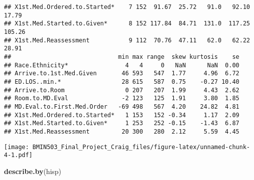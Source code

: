 \documentclass[]{article}
\newenvironment{Shaded}{\begin{snugshade}}{\end{snugshade}}
\newcommand{\KeywordTok}[1]{\textcolor[rgb]{0.13,0.29,0.53}{\textbf{#1}}}
\newcommand{\StringTok}[1]{\textcolor[rgb]{0.31,0.60,0.02}{#1}}
\newcommand{\CommentTok}[1]{\textcolor[rgb]{0.56,0.35,0.01}{\textit{#1}}}
\newcommand{\OperatorTok}[1]{\textcolor[rgb]{0.81,0.36,0.00}{\textbf{#1}}}
\newcommand{\NormalTok}[1]{#1}
\begin{document}
\begin{verbatim}
## X1st.Med.Ordered.to.Started*    7 152  91.67  25.72   91.0   92.10  17.79
## X1st.Med.Started.to.Given*      8 152 117.84  84.71  131.0  117.25 105.26
## X1st.Med.Reassessment           9 112  70.76  47.11   62.0   62.22  28.91
##                              min max range  skew kurtosis    se
## Race.Ethnicity*                4   4     0   NaN      NaN  0.00
## Arrive.to.1st.Med.Given       46 593   547  1.77     4.96  6.72
## ED.LOS..min.*                 28 615   587  0.75    -0.27 10.40
## Arrive.to.Room                 0 207   207  1.99     4.43  2.62
## Room.to.MD.Eval               -2 123   125  1.91     3.80  1.85
## MD.Eval.to.First.Med.Order   -69 498   567  4.20    24.82  4.81
## X1st.Med.Ordered.to.Started*   1 153   152 -0.34     1.17  2.09
## X1st.Med.Started.to.Given*     1 253   252 -0.15    -1.43  6.87
## X1st.Med.Reassessment         20 300   280  2.12     5.59  4.45
\end{verbatim}

\begin{Shaded}
\end{Shaded}

\texttt{[image: BMIN503\_Final\_Project\_Craig\_files/figure-latex/unnamed-chunk-4-1.pdf]}

\begin{Shaded}
\begin{Highlighting}[]
\KeywordTok{describe.by}\NormalTok{(hisp)}
\end{Highlighting}
\end{Shaded}
\end{document}
